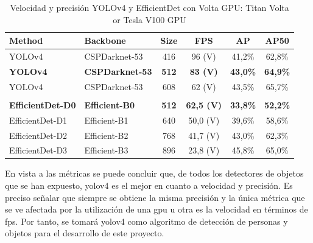 \begin{table}[ht]
\centering
\caption{Velocidad y precisión YOLOv4 y EfficientDet con Volta GPU: Titan Volta or Tesla V100 GPU \cite{bochkovskiy2020yolov4} \cite{tan2020efficientdet}}
\label{tab:volta-speed-accuracy}
\begin{tabular}{llcccc}
\hline
\textbf{Method}          & \textbf{Backbone}      & \textbf{Size}        & \textbf{FPS}         & \textbf{AP}          & \textbf{AP50}        \\ \hline
YOLOv4                   & CSPDarknet-53          & 416                  & 96 (V)               & 41,2\%               & 62,8\%               \\
\textbf{YOLOv4}          & \textbf{CSPDarknet-53} & \textbf{512}         & \textbf{83 (V)}      & \textbf{43,0\%}      & \textbf{64,9\%}      \\
YOLOv4                   & CSPDarknet-53          & 608                  & 62 (V)               & 43,5\%               & 65,7\%               \\
                         &                        & \multicolumn{1}{l}{} & \multicolumn{1}{l}{} & \multicolumn{1}{l}{} & \multicolumn{1}{l}{} \\
\textbf{EfficientDet-D0} & \textbf{Efficient-B0}  & \textbf{512}         & \textbf{62,5 (V)}    & \textbf{33,8\%}      & \textbf{52,2\%}      \\
EfficientDet-D1          & Efficient-B1           & 640                  & 50,0 (V)             & 39,6\%               & 58,6\%               \\
EfficientDet-D2          & Efficient-B2           & 768                  & 41,7 (V)             & 43,0\%               & 62,3\%               \\
EfficientDet-D3          & Efficient-B3           & 896                  & 23,8 (V)             & 45,8\%               & 65,0\%               \\ \hline
\end{tabular}
\end{table}

En vista a las métricas se puede concluir que, de todos los detectores de objetos que se han expuesto, \gls{yolov4} es el mejor en cuanto a velocidad y precisión. Es preciso señalar que siempre se obtiene la misma precisión y la única métrica que se ve afectada por la utilización de una \gls{gpu} u otra es la velocidad en términos de \gls{fps}. Por tanto, se tomará \gls{yolov4} como algoritmo de detección de personas y objetos para el desarrollo de este proyecto.

